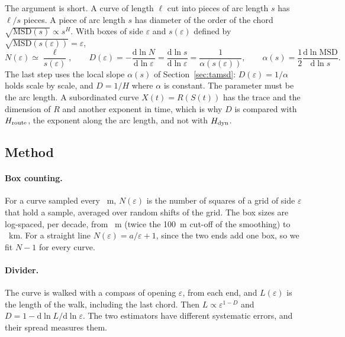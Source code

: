 The argument is short. A curve of length $\ell$ cut into pieces of arc length $s$ has $\ell/s$ pieces. A piece of arc length $s$ has diameter of the order of the chord $\sqrt{\mathrm{MSD}(s)}\propto s^{H}$.
With boxes of side $\varepsilon$ and $s(\varepsilon)$ defined by $\sqrt{\mathrm{MSD}(s(\varepsilon))}=\varepsilon$,
\begin{equation}
  N(\varepsilon)\simeq \frac{\ell}{s(\varepsilon)},\qquad
  D(\varepsilon)=-\frac{\mathrm d\ln N}{\mathrm d\ln\varepsilon}=\frac{\mathrm d\ln s}{\mathrm d\ln\varepsilon}=\frac{1}{\alpha(s(\varepsilon))},\qquad
  \alpha(s)=\frac12\frac{\mathrm d\ln\mathrm{MSD}}{\mathrm d\ln s}.
  \label{eq:dimalpha}
\end{equation}
The last step uses the local slope $\alpha(s)$ of Section~\ref{sec:tamsd}: $D(\varepsilon)=1/\alpha$ holds scale by scale, and $D=1/H$ where $\alpha$ is constant. The parameter must be the arc length.
A subordinated curve $X(t)=R(S(t))$ has the trace and the dimension of $R$ and another exponent in time, which is why $D$ is compared with $H_{\mathrm{route}}$, the exponent along the arc length, and not with $H_{\mathrm{dyn}}$.

\subsection{Method}

\paragraph{Box counting.} For a curve sampled every \DmStep~m, $N(\varepsilon)$ is the number of squares of a grid of side $\varepsilon$ that hold a sample, averaged over \DmOffsets{} random shifts of the grid.
The box sizes are log-spaced, \DmPerDecade{} per decade, from \DmEpsMin~m (twice the 100~m cut-off of the smoothing) to \DmEpsMaxKm~km. For a straight line $N(\varepsilon)=a/\varepsilon+1$, since the two ends
add one box, so we fit $N-1$ for every curve.

\paragraph{Divider.} The curve is walked with a compass of opening $\varepsilon$, from each end, and $L(\varepsilon)$ is the length of the walk, including the last chord. Then $L\propto\varepsilon^{1-D}$ and
$D=1-\mathrm d\ln L/\mathrm d\ln\varepsilon$. The two estimators have different systematic errors, and their spread measures them.

